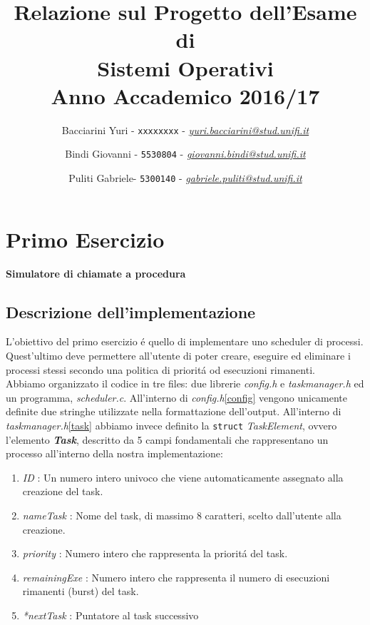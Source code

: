 \documentclass[a4paper]{article}
\begin{document}
 

\title{\vspace{2cm}Relazione sul Progetto dell'Esame di\\ \textbf{Sistemi Operativi}\\ Anno Accademico 2016/17}

\author{Bacciarini Yuri - \texttt{xxxxxxxx} - \href{mailto:yuri.bacciarini@stud.unifi.it}{\textit{yuri.bacciarini@stud.unifi.it}}
   \and Bindi Giovanni - \texttt{5530804} - \href{mailto:giovanni.bindi@stud.unifi.it}{\textit{giovanni.bindi@stud.unifi.it}}
   \and Puliti Gabriele- \texttt{5300140} - \href{mailto:gabriele.puliti@stud.unifi.it}{\textit{gabriele.puliti@stud.unifi.it}}} 



\maketitle

\tableofcontents

\newpage
\section{Primo Esercizio}
\textbf{Simulatore di chiamate a procedura}
\subsection{Descrizione dell'implementazione}
L'obiettivo del primo esercizio \'e quello di implementare uno scheduler di processi. Quest'ultimo deve permettere all'utente di poter creare, eseguire ed eliminare i processi stessi secondo una politica di priorit\'a od esecuzioni rimanenti. \\
Abbiamo organizzato il codice in tre files: due librerie \textit{config.h} e \textit{taskmanager.h} ed un programma, \textit{scheduler.c}. All'interno di \textit{config.h}\ref{config} vengono unicamente definite due stringhe utilizzate nella formattazione dell'output. All'interno di \textit{taskmanager.h}\ref{task} abbiamo invece definito la \texttt{struct} \textit{TaskElement}, ovvero l'elemento \textbf{\textit{Task}}, descritto da 5 campi fondamentali che rappresentano un processo all'interno della nostra implementazione:

\begin{enumerate}
\item \textit{ID} : Un numero intero univoco che viene automaticamente assegnato alla creazione del task.
\item \textit{nameTask} : Nome del task, di massimo 8 caratteri, scelto dall'utente alla creazione.
\item \textit{priority} : Numero intero che rappresenta la priorit\'a del task.
\item \textit{remainingExe} : Numero intero che rappresenta il numero di esecuzioni rimanenti (burst) del task.
\item \textit{*nextTask} : Puntatore al task successivo
\end{enumerate}
\end{document}

